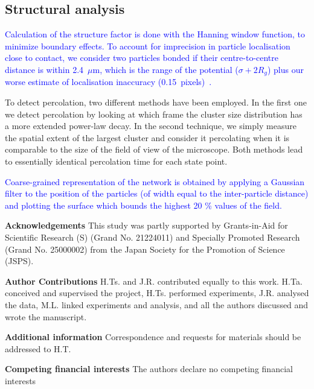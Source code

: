\documentclass[preprint,amsmath,amssymb,superscriptaddress]{revtex4-1}
\begin{document}
\subsection*{Structural analysis}

\textcolor{blue}{Calculation of the structure factor is done with the Hanning window function, to minimize boundary effects. To account for imprecision in particle localisation close to contact, we consider two particles bonded if their centre-to-centre distance is within 2.4~$\mu$m, which is the range of the potential ($\sigma+2R_g$) plus our worse estimate of localisation inaccuracy (0.15~pixels)~\cite{Leocmach2013}.}

To detect percolation, two different methods have been employed. In the first one we detect percolation by looking at which frame the cluster size distribution has a more extended power-law decay. 
In the second technique, we simply measure the spatial extent of the largest cluster and consider it percolating when it is comparable to the size of the field of view of the microscope. 
Both methods lead to essentially identical percolation time for each state point.

\textcolor{blue}{Coarse-grained representation of the network is obtained by applying a Gaussian filter to the position of the particles (of width equal to the inter-particle distance) and plotting the surface which bounds the highest 20 \% values of the field.}





\bigskip
\noindent
{\bf Acknowledgements} 
This study was partly supported by Grants-in-Aid for Scientific Research (S) (Grand No. 21224011) and Specially Promoted Research (Grand No. 25000002) from the Japan Society for the Promotion of Science (JSPS). 

\medskip
\noindent
{\bf Author Contributions} 
H.Ts. and J.R. contributed equally to this work. 
H.Ta. conceived and supervised the project, H.Ts. performed experiments, J.R. analysed the data, M.L. linked experiments and analysis, and all the authors discussed and wrote the manuscript. 

\medskip
\noindent
{\bf Additional information} 
Correspondence and requests for materials should be addressed to H.T. 

\medskip
\noindent
{\bf Competing financial interests}
The authors declare no competing financial interests
\end{document}
